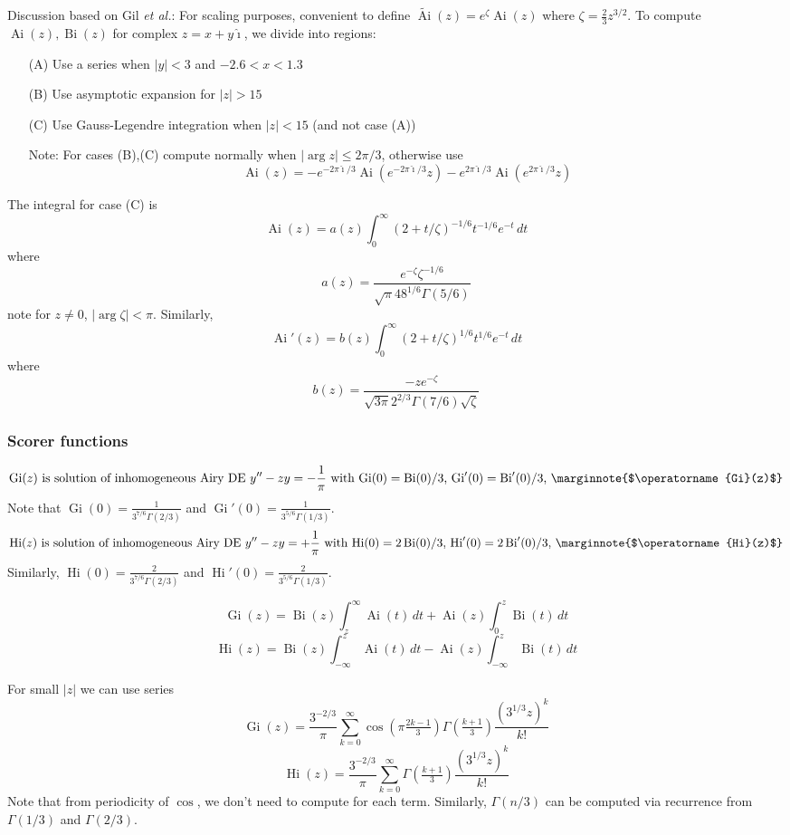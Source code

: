 \documentclass[10pt,dvipdfmx,letterpaper,twoside]{article}
\let\O=\operatorname
\newcommand{\ii}{{\hat{\imath}}}
\let\DEF=\marginnote
\let\Gam=\Gamma
\begin{document}
Discussion based on Gil {\it et al.}:
For scaling purposes, convenient to define $\widetilde{\O{Ai}}(z) = e^{\zeta}\O{Ai}(z)$ where $\zeta=\frac23 z^{3/2}$.
To compute $\O{Ai}(z),\O{Bi}(z)$ for complex $z=x+y\ii$, we divide into regions:
\begin{enumerate}
  \item[(A)] Use a series when $|y|<3$ and $-2.6<x<1.3$
  \item[(B)] Use asymptotic expansion for $|z|>15$
  \item[(C)] Use Gauss-Legendre integration when $|z|<15$ (and not case (A))
  \item[Note:] For cases (B),(C) compute normally when $|\arg z|\leq2\pi/3$, otherwise use
    \[ \O{Ai}(z) = -e^{-2\pi\ii/3}\O{Ai}(e^{-2\pi\ii/3}z) -e^{2\pi\ii/3}\O{Ai}(e^{2\pi\ii/3}z) \]
\end{enumerate}
The integral for case (C) is
\[ \O{Ai}(z) = a(z) \int_0^\infty (2+t/\zeta)^{-1/6} t^{-1/6} e^{-t} \,dt \]
where
\[ a(z) = \frac{e^{-\zeta}\zeta^{-1/6}}{\sqrt{\pi} 48^{1/6} \Gam(5/6)} \]
note for $z\neq0$, $|\arg\zeta|<\pi$.
Similarly,
\[ \O{Ai}'(z) = b(z) \int_0^\infty (2+t/\zeta)^{1/6} t^{1/6} e^{-t} \,dt \]
where
\[ b(z) = \frac{-z e^{-\zeta}}{\sqrt{3\pi} 2^{2/3} \Gam(7/6)\sqrt\zeta} \]

\subsubsection{Scorer functions}
\[ \O{Gi}(z) \text{\ is solution of inhomogeneous Airy DE $y''-z y = -\frac1\pi$ with $\O{Gi}(0)=\O{Bi}(0)/3$, $\O{Gi}'(0)=\O{Bi}'(0)/3$, }
  \DEF{$\O{Gi}(z)$} \]
Note that $\O{Gi}(0) = \frac{1}{3^{7/6}\Gam(2/3)}$ and $\O{Gi}'(0) = \frac{1}{3^{5/6}\Gam(1/3)}$.
\[ \O{Hi}(z) \text{\ is solution of inhomogeneous Airy DE $y''-z y = +\frac1\pi$ with $\O{Hi}(0)=2\O{Bi}(0)/3$, $\O{Hi}'(0)=2\O{Bi}'(0)/3$, }
  \DEF{$\O{Hi}(z)$} \]
Similarly, $\O{Hi}(0) = \frac{2}{3^{7/6}\Gam(2/3)}$ and $\O{Hi}'(0) = \frac{2}{3^{5/6}\Gam(1/3)}$.

\[ \O{Gi}(z) = \O{Bi}(z)\int_z^\infty\O{Ai}(t)\,dt + \O{Ai}(z)\int_0^z\O{Bi}(t)\,dt \]
\[ \O{Hi}(z) = \O{Bi}(z)\int_{-\infty}^z\O{Ai}(t)\,dt - \O{Ai}(z)\int_{-\infty}^z\O{Bi}(t)\,dt \]

For small $|z|$ we can use series
\[ \O{Gi}(z) = \frac{3^{-2/3}}{\pi}\sum_{k=0}^\infty \cos(\pi\tfrac{2k-1}{3})\Gam(\tfrac{k+1}{3})\frac{(3^{1/3} z)^k}{k!} \]
\[ \O{Hi}(z) = \frac{3^{-2/3}}{\pi}\sum_{k=0}^\infty                         \Gam(\tfrac{k+1}{3})\frac{(3^{1/3} z)^k}{k!} \]
Note that from periodicity of $\cos$, we don't need to compute for each term.
Similarly, $\Gam(n/3)$ can be computed via recurrence from $\Gam(1/3)$ and $\Gam(2/3)$.
\end{document}
